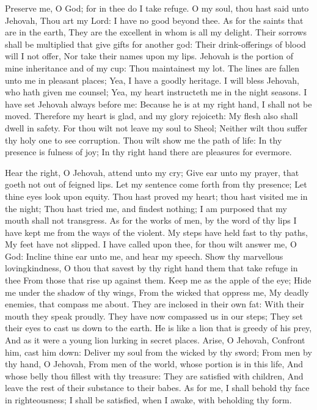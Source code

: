 Preserve me, O God; for in thee do I take refuge.  O my soul, thou hast said unto Jehovah, Thou art my Lord: I have no good beyond thee.  As for the saints that are in the earth, They are the excellent in whom is all my delight.  Their sorrows shall be multiplied that give gifts for another god: Their drink-offerings of blood will I not offer, Nor take their names upon my lips.  Jehovah is the portion of mine inheritance and of my cup: Thou maintainest my lot.  The lines are fallen unto me in pleasant places; Yea, I have a goodly heritage.  I will bless Jehovah, who hath given me counsel; Yea, my heart instructeth me in the night seasons.  I have set Jehovah always before me: Because he is at my right hand, I shall not be moved.  Therefore my heart is glad, and my glory rejoiceth: My flesh also shall dwell in safety.  For thou wilt not leave my soul to Sheol; Neither wilt thou suffer thy holy one to see corruption.  Thou wilt show me the path of life: In thy presence is fulness of joy; In thy right hand there are pleasures for evermore. 

Hear the right, O Jehovah, attend unto my cry; Give ear unto my prayer, that goeth not out of feigned lips.  Let my sentence come forth from thy presence; Let thine eyes look upon equity.  Thou hast proved my heart; thou hast visited me in the night; Thou hast tried me, and findest nothing; I am purposed that my mouth shall not transgress.  As for the works of men, by the word of thy lips I have kept me from the ways of the violent.  My steps have held fast to thy paths, My feet have not slipped.  I have called upon thee, for thou wilt answer me, O God: Incline thine ear unto me, and hear my speech.  Show thy marvellous lovingkindness, O thou that savest by thy right hand them that take refuge in thee From those that rise up against them.  Keep me as the apple of the eye; Hide me under the shadow of thy wings,  From the wicked that oppress me, My deadly enemies, that compass me about.  They are inclosed in their own fat: With their mouth they speak proudly.  They have now compassed us in our steps; They set their eyes to cast us down to the earth.  He is like a lion that is greedy of his prey, And as it were a young lion lurking in secret places.  Arise, O Jehovah, Confront him, cast him down: Deliver my soul from the wicked by thy sword;  From men by thy hand, O Jehovah, From men of the world, whose portion is in this life, And whose belly thou fillest with thy treasure: They are satisfied with children, And leave the rest of their substance to their babes.  As for me, I shall behold thy face in righteousness; I shall be satisfied, when I awake, with beholding thy form. 

